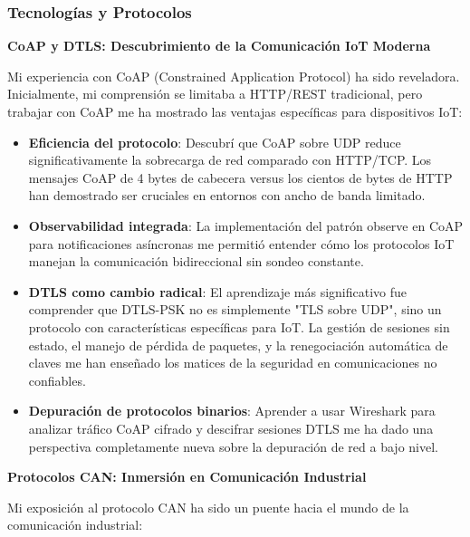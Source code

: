 \subsubsection{Tecnologías y Protocolos}

\textbf{CoAP y DTLS: Descubrimiento de la Comunicación IoT Moderna}

Mi experiencia con CoAP (Constrained Application Protocol) ha sido reveladora. Inicialmente, mi comprensión se limitaba a HTTP/REST tradicional, pero trabajar con CoAP me ha mostrado las ventajas específicas para dispositivos IoT:

\begin{itemize}
    \item \textbf{Eficiencia del protocolo}: Descubrí que CoAP sobre UDP reduce significativamente la sobrecarga de red comparado con HTTP/TCP. Los mensajes CoAP de 4 bytes de cabecera versus los cientos de bytes de HTTP han demostrado ser cruciales en entornos con ancho de banda limitado.
    
    \item \textbf{Observabilidad integrada}: La implementación del patrón observe en CoAP para notificaciones asíncronas me permitió entender cómo los protocolos IoT manejan la comunicación bidireccional sin sondeo constante.
    
    \item \textbf{DTLS como cambio radical}: El aprendizaje más significativo fue comprender que DTLS-PSK no es simplemente "TLS sobre UDP", sino un protocolo con características específicas para IoT. La gestión de sesiones sin estado, el manejo de pérdida de paquetes, y la renegociación automática de claves me han enseñado los matices de la seguridad en comunicaciones no confiables.
    
    \item \textbf{Depuración de protocolos binarios}: Aprender a usar Wireshark para analizar tráfico CoAP cifrado y descifrar sesiones DTLS me ha dado una perspectiva completamente nueva sobre la depuración de red a bajo nivel.
\end{itemize}

\textbf{Protocolos CAN: Inmersión en Comunicación Industrial}

Mi exposición al protocolo CAN ha sido un puente hacia el mundo de la comunicación industrial:


